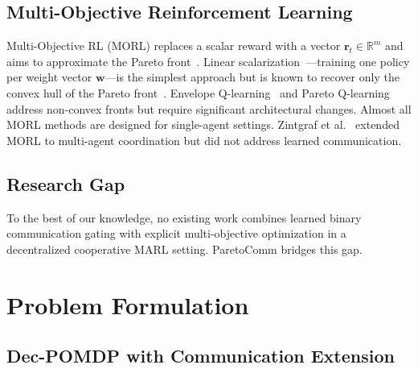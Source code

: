 \documentclass[runningheads]{llncs}
\newcommand{\R}{\mathbb{R}}
\newcommand{\bw}{\mathbf{w}}
\newcommand{\br}{\mathbf{r}}
\begin{document}
\subsection{Multi-Objective Reinforcement Learning}

Multi-Objective RL (MORL) replaces a scalar reward with a vector
$\br_t \in \R^m$ and aims to approximate the Pareto
front~\cite{hayes2022practical}.
Linear scalarization~\cite{roijers2013survey}---training one policy
per weight vector $\bw$---is the simplest approach but is known to
recover only the convex hull of the Pareto
front~\cite{das1997nonlinear}.
Envelope Q-learning~\cite{yang2019generalized} and Pareto
Q-learning~\cite{van2014multi} address non-convex fronts but require
significant architectural changes.
Almost all MORL methods are designed for single-agent settings.
Zintgraf et al.~\cite{zintgraf2015quality} extended MORL to
multi-agent coordination but did not address learned communication.

\subsection{Research Gap}

To the best of our knowledge, no existing work combines learned binary
communication gating with explicit multi-objective optimization in a
decentralized cooperative MARL setting.
ParetoComm bridges this gap.

\section{Problem Formulation}
\label{sec:formulation}

\subsection{Dec-POMDP with Communication Extension}
\end{document}
